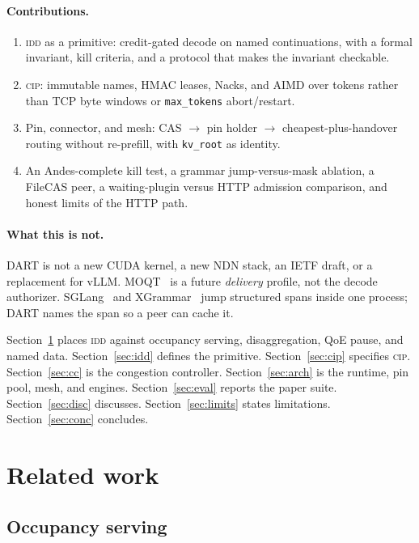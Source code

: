 \documentclass{article}
\theoremstyle{definition}
\newcommand{\cip}{\textsc{cip}}
\newcommand{\idd}{\textsc{idd}}
\newcommand{\kvroot}{\texttt{kv\_root}}
\begin{document}
\paragraph{Contributions.}
\begin{enumerate}[leftmargin=1.6em,itemsep=2pt]
\item \idd{} as a primitive: credit-gated decode on named continuations, with a formal invariant, kill criteria, and a protocol that makes the invariant checkable.
\item \cip{}: immutable names, HMAC leases, Nacks, and AIMD over tokens rather than TCP byte windows or \texttt{max\_tokens} abort/restart.
\item Pin, connector, and mesh: CAS $\rightarrow$ pin holder $\rightarrow$ cheapest-plus-handover routing without re-prefill, with \kvroot{} as identity.
\item An Andes-complete kill test, a grammar jump-versus-mask ablation, a FileCAS peer, a waiting-plugin versus HTTP admission comparison, and honest limits of the HTTP path.
\end{enumerate}

\paragraph{What this is not.}
DART is not a new CUDA kernel, a new NDN stack, an IETF draft, or a replacement for vLLM.
MOQT~\citep{ietf-moqt} is a future \emph{delivery} profile, not the decode authorizer.
SGLang~\citep{zheng2024sglang} and XGrammar~\citep{dong2024xgrammar} jump structured spans inside one process; DART names the span so a peer can cache it.

Section~\ref{sec:related} places \idd{} against occupancy serving, disaggregation, QoE pause, and named data.
Section~\ref{sec:idd} defines the primitive.
Section~\ref{sec:cip} specifies \cip{}.
Section~\ref{sec:cc} is the congestion controller.
Section~\ref{sec:arch} is the runtime, pin pool, mesh, and engines.
Section~\ref{sec:eval} reports the paper suite.
Section~\ref{sec:disc} discusses.
Section~\ref{sec:limits} states limitations.
Section~\ref{sec:conc} concludes.

\section{Related work}
\label{sec:related}

\subsection{Occupancy serving}
\end{document}

